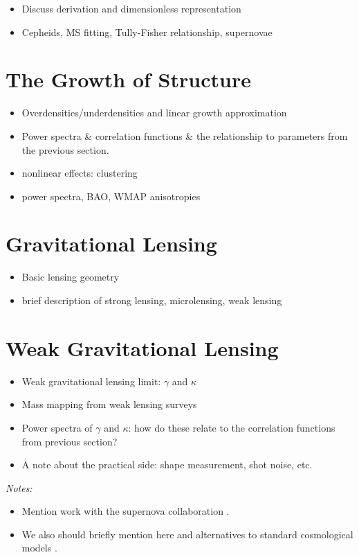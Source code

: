 \begin{itemize}
  \item Discuss derivation and dimensionless representation
  \item Cepheids, MS fitting, Tully-Fisher relationship, supernovae
\end{itemize}

\section{The Growth of Structure}

\begin{itemize}
  \item Overdensities/underdensities and linear growth approximation
  \item Power spectra \& correlation functions \& the relationship to
    parameters from the previous section.
  \item nonlinear effects: clustering
  \item power spectra, BAO, WMAP anisotropies
\end{itemize}

\section{Gravitational Lensing}
\begin{itemize}
  \item Basic lensing geometry
  \item brief description of strong lensing, microlensing, weak lensing
\end{itemize}

\section{Weak Gravitational Lensing}
\begin{itemize}
  \item Weak gravitational lensing limit: $\gamma$ and $\kappa$
  \item Mass mapping from weak lensing surveys
  \item Power spectra of $\gamma$ and $\kappa$: how do these relate to
    the correlation functions from previous section?
  \item A note about the practical side: shape measurement, shot noise,
    etc.
\end{itemize}

{\it Notes:}
\begin{itemize}
  \item Mention work with the supernova collaboration \citep{Kessler2009}.
  \item We also should briefly mention here \cite{Jain2011} and alternatives
    to standard cosmological models \citep[also][]{Sollerman2009}.
\end{itemize}
